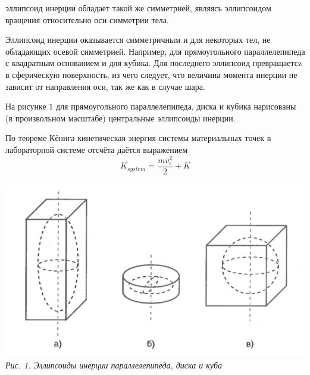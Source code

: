 \documentclass[12pt, a4paper]{article}
\begin{document}
\noindent\begin{minipage}[c]{0.67\textwidth} эллипсоид инерции обладает такой же симметрией, являясь эллипсоидом вращения относительно оси симметрии тела.

	Эллипсоид инерции оказывается симметричным и для некоторых тел, не обладающих осевой симметрией. Например, для прямоугольного параллелепипеда с квадратным основанием и для кубика. Для последнего эллипсоид превращаетсz в сферическую поверхность, из чего следует, что величина момента инерции не зависит от направления оси, так же как в случае шара. 
	
	На рисунке $1$ для прямоугольного параллелепипеда, диска и кубика нарисованы (в произвольном масштабе) центральные эллипсоиды инерции.
	
	\hspace{0.5cm}По теореме Кёнига кинетическая энергия системы материальных точек в лабораторной системе отсчёта даётся выражением
\begin{equation}
	K_{system} = \dfrac{mv_c^2}{2}+ K
\end{equation}
\end{minipage}
\begin{minipage}[c]{0.32\textwidth}
	\begin{center}
		\includegraphics[scale=0.45]{Pics/picture1.jpg} \\
		\textit{\textcolor[HTML]{000000}{Рис. 1. Эллипсоиды инерции параллелепипеда, диска и куба}}
	\end{center}
\end{minipage}  
\end{document}

